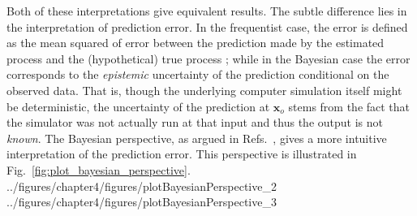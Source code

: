 Both of these interpretations give equivalent results.
The subtle difference lies in the interpretation of prediction error.
In the frequentist case, the error is defined as the mean squared of error between the prediction made by the estimated process and the (hypothetical) true process \cite{Isaaks1989};
while in the Bayesian case the error corresponds to the \emph{epistemic} uncertainty of the prediction conditional on the observed data.
That is, though the underlying computer simulation itself might be deterministic, 
the uncertainty of the prediction at $\bm{x}_o$ stems from the fact that the simulator was not actually run at that input and thus the output is not \emph{known}. 
The Bayesian perspective, as argued in Refs.~\cite{Currin1991,Santner2003,OHagan2006}, gives a more intuitive interpretation of the prediction error.
This perspective is illustrated in Fig.~\ref{fig:plot_bayesian_perspective}.
{../figures/chapter4/figures/plotBayesianPerspective_2}
{../figures/chapter4/figures/plotBayesianPerspective_3}
